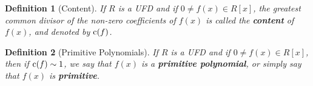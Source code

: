 \documentclass[9pt,landscape,a4paper]{article}
\newcommand{\hldefn}[1]{\textcolor{base16-eighties-magenta}{\textbf{#1}}}
\newcommand{\hlnoteb}[1]{\textcolor{base16-eighties-magenta}{\textbf{#1}}}
\theoremstyle{empty}
\newtheorem{defn}{Definition}
\begin{document}
\begin{multicols*}{5}
\begin{defn}[Content]
\label{defn:content}
If $R$ is a UFD and if $0 \neq f(x) \in R[x]$, the greatest common divisor of the non-zero coefficients of $f(x)$ is called the \hlnoteb{content} of $f(x)$, and denoted by $\operatorname{c}(f)$.
\end{defn}

\begin{defn}[Primitive Polynomials]
\label{defn:primitive_polynomials}
If $R$ is a UFD and if $0 \neq f(x) \in R[x]$, then if $\operatorname{c}(f) \sim 1$, we say that $f(x)$ is a \hlnoteb{primitive polynomial}, or simply say that $f(x)$ is \hldefn{primitive}.
\end{defn}

$ $ \\
$ $ \\
$ $ \\
$ $ \\
$ $ \\
$ $ \\
$ $ \\
$ $ \\
$ $ \\
$ $ \\
$ $ \\
$ $ \\
$ $ \\
$ $ \\
$ $ \\
$ $ \\
$ $ \\
$ $ \\
$ $ \\
$ $ \\
$ $ \\
$ $ \\
$ $ \\
$ $ \\
\end{multicols*}
\end{document}
